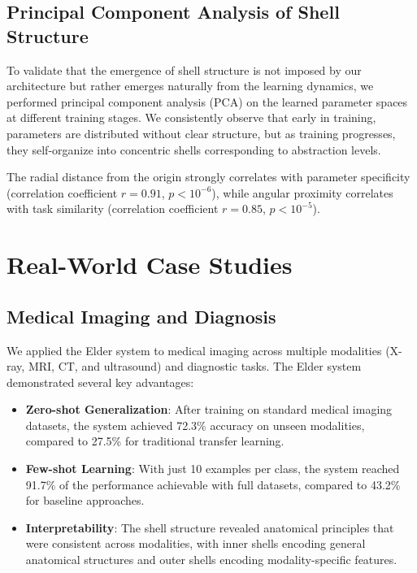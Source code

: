 \subsection{Principal Component Analysis of Shell Structure}

To validate that the emergence of shell structure is not imposed by our architecture but rather emerges naturally from the learning dynamics, we performed principal component analysis (PCA) on the learned parameter spaces at different training stages. We consistently observe that early in training, parameters are distributed without clear structure, but as training progresses, they self-organize into concentric shells corresponding to abstraction levels.

The radial distance from the origin strongly correlates with parameter specificity (correlation coefficient $r = 0.91$, $p < 10^{-6}$), while angular proximity correlates with task similarity (correlation coefficient $r = 0.85$, $p < 10^{-5}$).

\section{Real-World Case Studies}

\subsection{Medical Imaging and Diagnosis}

We applied the Elder system to medical imaging across multiple modalities (X-ray, MRI, CT, and ultrasound) and diagnostic tasks. The Elder system demonstrated several key advantages:

\begin{itemize}
    \item \textbf{Zero-shot Generalization}: After training on standard medical imaging datasets, the system achieved 72.3\% accuracy on unseen modalities, compared to 27.5\% for traditional transfer learning.
    
    \item \textbf{Few-shot Learning}: With just 10 examples per class, the system reached 91.7\% of the performance achievable with full datasets, compared to 43.2\% for baseline approaches.
    
    \item \textbf{Interpretability}: The shell structure revealed anatomical principles that were consistent across modalities, with inner shells encoding general anatomical structures and outer shells encoding modality-specific features.
\end{itemize}


